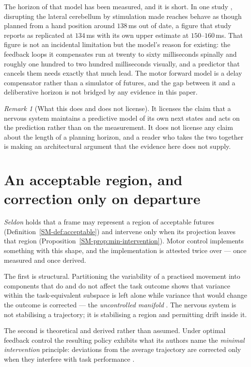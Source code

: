\documentclass[11pt,a4paper]{article}
\theoremstyle{remark}
\newtheorem{remark}{Remark}[section]
\begin{document}
The horizon of that model has been measured, and it is short. In one study \citep{miall2007},
disrupting the lateral cerebellum by
stimulation made reaches behave as though planned from a hand position around $138\,$ms out of
date, a figure that study reports as replicated at $134\,$ms with its own upper estimate at
$150$--$160\,$ms. That figure is not an incidental limitation but the model's reason for
existing: the feedback loops it compensates run at twenty to sixty milliseconds spinally and roughly one hundred to two hundred milliseconds visually, and a predictor that cancels them needs exactly that much lead. The motor
forward model is a delay compensator rather than a simulator of futures, and the gap between it and
a deliberative horizon is not bridged by any evidence in this paper.

\begin{remark}[What this does and does not license]\label{rem:motor-limits}
It licenses the claim that a nervous system maintains a predictive model of its own next states and
acts on the prediction rather than on the measurement. It does not license any claim about the
length of a planning horizon, and a reader who takes the two together is making an architectural
argument that the evidence here does not supply.
\end{remark}

\section{An acceptable region, and correction only on departure}\label{sec:region}
\emph{Seldon} holds that a frame may represent a region of acceptable futures
(Definition~\ref{SM-def:acceptable}) and intervene only when its projection leaves that region
(Proposition~\ref{SM-prop:min-intervention}). Motor control implements something with this shape, and
the implementation is attested twice over --- once measured and once derived.

The first is structural. Partitioning the variability of a practised movement into components that
do and do not affect the task outcome shows that variance within the task-equivalent subspace is
left alone while variance that would change the outcome is corrected --- the
\emph{uncontrolled manifold} \citep{scholz1999}. The nervous system is not stabilising a
trajectory; it is stabilising a region and permitting drift inside it.

The second is theoretical and derived rather than assumed. Under optimal feedback control the
resulting policy exhibits what its authors name the \emph{minimal intervention} principle:
deviations from the average trajectory are corrected only when they interfere with task
performance \citep{todorov2002}.
\end{document}
